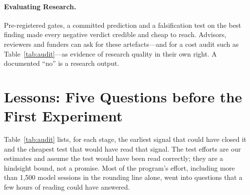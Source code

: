 \documentclass[11pt]{article}
\begin{document}
\paragraph{Evaluating Research.} Pre-registered gates, a committed prediction and a falsification test on the best finding made every negative verdict credible and cheap to reach. Advisors, reviewers and funders can ask for these artefacts---and for a cost audit such as Table~\ref{tab:audit}---as evidence of research quality in their own right. A documented ``no'' is a research output.


\section{Lessons: Five Questions before the First Experiment}
\label{sec:lessons}

Table~\ref{tab:audit} lists, for each stage, the earliest signal that could have closed it and the cheapest test that would have read that signal. The test efforts are our estimates and assume the test would have been read correctly; they are a hindsight bound, not a promise. Most of the program's effort, including more than 1,500 model sessions in the rounding line alone, went into questions that a few hours of reading could have answered.
\end{document}
